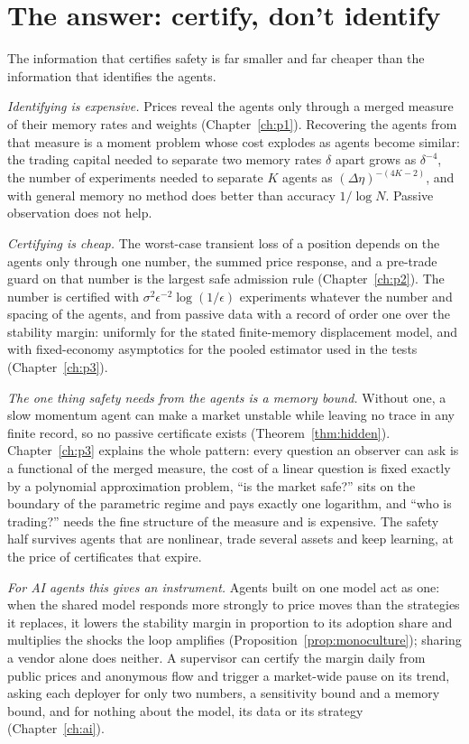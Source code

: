 \section{The answer: certify, don't identify}

The information that certifies safety is far smaller and far cheaper than the information that identifies the agents.

\emph{Identifying is expensive.} Prices reveal the agents only through a merged measure of their memory rates and weights (Chapter~\ref{ch:p1}). Recovering the agents from that measure is a moment problem whose cost explodes as agents become similar: the trading capital needed to separate two memory rates $\delta$ apart grows as $\delta^{-4}$, the number of experiments needed to separate $K$ agents as $(\Delta\eta)^{-(4K-2)}$, and with general memory no method does better than accuracy $1/\log N$. Passive observation does not help.

\emph{Certifying is cheap.} The worst-case transient loss of a position depends on the agents only through one number, the summed price response, and a pre-trade guard on that number is the largest safe admission rule (Chapter~\ref{ch:p2}). The number is certified with $\sigma^2\epsilon^{-2}\log(1/\epsilon)$ experiments whatever the number and spacing of the agents, and from passive data with a record of order one over the stability margin: uniformly for the stated finite-memory displacement model, and with fixed-economy asymptotics for the pooled estimator used in the tests (Chapter~\ref{ch:p3}).

\emph{The one thing safety needs from the agents is a memory bound.} Without one, a slow momentum agent can make a market unstable while leaving no trace in any finite record, so no passive certificate exists (Theorem~\ref{thm:hidden}). Chapter~\ref{ch:p3} explains the whole pattern: every question an observer can ask is a functional of the merged measure, the cost of a linear question is fixed exactly by a polynomial approximation problem, ``is the market safe?'' sits on the boundary of the parametric regime and pays exactly one logarithm, and ``who is trading?'' needs the fine structure of the measure and is expensive. The safety half survives agents that are nonlinear, trade several assets and keep learning, at the price of certificates that expire.

\emph{For AI agents this gives an instrument.} Agents built on one model act as one: when the shared model responds more strongly to price moves than the strategies it replaces, it lowers the stability margin in proportion to its adoption share and multiplies the shocks the loop amplifies (Proposition~\ref{prop:monoculture}); sharing a vendor alone does neither. A supervisor can certify the margin daily from public prices and anonymous flow and trigger a market-wide pause on its trend, asking each deployer for only two numbers, a sensitivity bound and a memory bound, and for nothing about the model, its data or its strategy (Chapter~\ref{ch:ai}).


